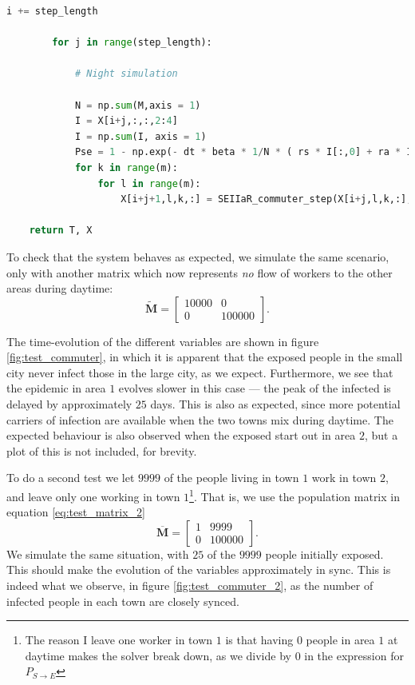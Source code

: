 \begin{lstlisting}[language=Python,label={lst:commuter},caption={SEIIaR commuter algorithm implemented in python}]
        i += step_length

        for j in range(step_length):

            # Night simulation 
            
            N = np.sum(M,axis = 1)
            I = X[i+j,:,:,2:4]
            I = np.sum(I, axis = 1)
            Pse = 1 - np.exp(- dt * beta * 1/N * ( rs * I[:,0] + ra * I[:,1] ))
            for k in range(m):
                for l in range(m):
                    X[i+j+1,l,k,:] = SEIIaR_commuter_step(X[i+j,l,k,:],Pse[k],Pei,Peia,Pir,Piar)

    return T, X
\end{lstlisting}

To check that the system behaves as expected, we simulate the same scenario, only with another matrix which now represents \textit{no} flow of workers to the other areas during daytime:
\begin{equation}\label{eq:test_matrix}
	\mathbf{\widetilde{M}} = \begin{bmatrix}
		10000 & 0 \\
		0 & 100000 
	\end{bmatrix}.
\end{equation}

The time-evolution of the different variables are shown in figure \ref{fig:test_commuter}, in which it is apparent that the exposed people in the small city never infect those in the large city, as we expect. Furthermore, we see that the epidemic in area $1$ evolves slower in this case --- the peak of the infected is delayed by approximately $25$ days. This is also as expected, since more potential carriers of infection are available when the two towns mix during daytime. The expected behaviour is also observed when the exposed start out in area $2$, but a plot of this is not included, for brevity. 

To do a second test we let $9999$ of the people living in town $1$ work in town $2$, and leave only one working in town $1$\footnote{The reason I leave one worker in town $1$ is that having $0$ people in area $1$ at daytime makes the solver break down, as we divide by $0$ in the expression for $P_{S\to E}$}. That is, we use the population matrix in equation \eqref{eq:test_matrix_2}
\begin{equation}\label{eq:test_matrix_2}
	\mathbf{\overline{M}} = \begin{bmatrix}
		1 & 9999 \\
		0 & 100000 
	\end{bmatrix}.
\end{equation}
We simulate the same situation, with $25$ of the $9999$ people initially exposed. This should make the evolution of the variables approximately in sync. This is indeed what we observe, in figure \ref{fig:test_commuter_2}, as the number of infected people in each town are closely synced.

